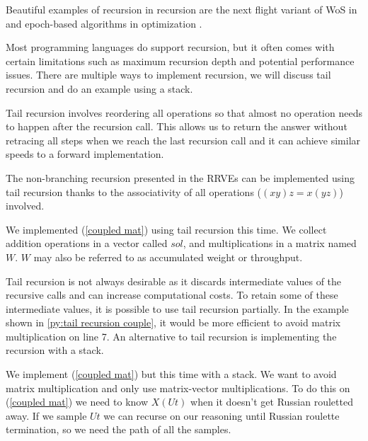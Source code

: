 \documentclass[a4paper,12pt]{article}
\begin{document}
\begin{related}
    Beautiful examples of recursion in recursion are
    the next flight variant of WoS in
    \cite{sawhney_grid-free_2022} and epoch-based algorithms in optimization
    \cite{gupta_convergence_2021}.
\end{related}

Most programming languages do support recursion, but it often comes with certain
limitations such as maximum recursion depth and potential performance issues.
There are multiple ways to implement recursion, we will discuss tail recursion and
do an example using a stack.

\begin{technique}
    Tail recursion involves reordering all operations
    so that almost no operation needs to happen after
    the recursion call. This allows us to return the
    answer without retracing all steps when we reach
    the last recursion call and it can achieve similar
    speeds to a forward implementation.
\end{technique}

The non-branching recursion presented in the RRVEs can
be implemented using tail recursion thanks to the associativity
of all operations ($(xy)z = x(yz)$) involved.

\begin{pythonn} \label{py:tail recursion couple}
    We implemented (\ref{coupled mat}) using tail recursion this time. We
    collect addition operations in a vector called $sol$, and multiplications
    in a matrix named $W$. $W$ may also be referred to as accumulated weight
    or throughput.
    \vspace{0.3cm}
\end{pythonn}

Tail recursion is not always desirable as it discards intermediate values
of the recursive calls and can increase computational costs. To retain
some of these intermediate values, it is possible to use tail recursion partially.
In the example shown in \ref{py:tail recursion couple}, it would be more efficient
to avoid matrix multiplication on line 7. An alternative to tail recursion is implementing
the recursion with a stack.

\begin{pythonn} \label{py:stack recursion couple}
    We implement (\ref{coupled mat}) but this time with a stack.
    We want to avoid matrix multiplication and only use matrix-vector multiplications.
    To do this on (\ref{coupled mat}) we need to know $X(Ut)$ when
    it doesn't get Russian rouletted away. If we sample $Ut$ we can recurse
    on our reasoning until Russian roulette termination, so we need the path
    of all the samples.
    \vspace{0.3cm}
\end{pythonn}
\end{document}

